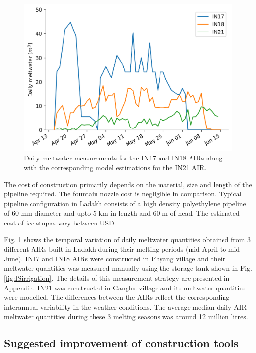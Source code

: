 \begin{figure}[htb]
\centering
\includegraphics[width=12cm]{figs/melt.png}

\caption{Daily meltwater measurements for the IN17 and IN18 AIRs along with the corresponding model estimations
for the IN21 AIR. }

\label{fig:ISmelt}
\end{figure}

The cost of construction primarily depends on the material, size and length of the pipeline required. The
fountain nozzle cost is negligible in comparison. Typical pipeline configuration in Ladakh consists of a high
density polyethylene pipeline of 60 mm diameter and upto 5 km in length and 60 m of head. The estimated cost
of ice stupas vary between USD.

Fig. \ref{fig:ISmelt} shows the temporal variation of daily meltwater quantities obtained from 3 different AIRs
built in Ladakh during their melting periods (mid-April to mid-June). IN17 and IN18 AIRs were constructed in
Phyang village and their meltwater quantities was measured manually using the storage tank shown in Fig.
\ref{fig:ISirrigation}. The details of this measurement strategy are presented in Appendix. IN21 was constructed
in Gangles village and its meltwater quantities were modelled. The differences between the AIRs reflect the
corresponding interannual variability in the weather conditions. The average median daily AIR meltwater
quantities during these 3 melting seasons was around 12 million litres.    

\subsection{Suggested improvement of construction tools}

